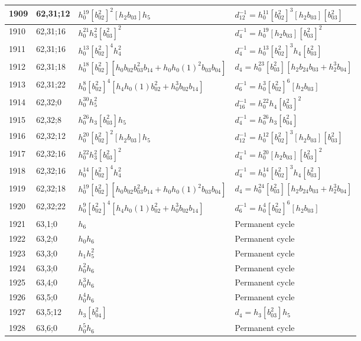\documentclass{article}
\begin{document}
\begin{longtable}{|l|l|>{\raggedright\arraybackslash}p{6cm}|>{\raggedright\arraybackslash}p{6cm}|}
1909 & 62,31;12 & $h_0^{19}[b_{02}^2]^2[h_2b_{03}]h_5$ & $d_{12}^{-1}=h_0^{11}[b_{02}^2]^3[h_2b_{03}][b_{03}^2]$\\
\hline
1910 & 62,31;16 & $h_0^{21}h_3^2[b_{03}^2]^2$ & $d_{4}^{-1}=h_0^{19}[h_2b_{03}][b_{03}^2]^2$\\
1911 & 62,31;16 & $h_0^{13}[b_{02}^2]^4h_4^2$ & $d_{4}^{-1}=h_0^{13}[b_{02}^2]^3h_4[b_{03}^2]$\\
\hline
1912 & 62,31;18 & $h_0^{18}[b_{02}^2][h_0b_{02}b_{03}^2b_{14} + h_0h_0(1)^2b_{03}b_{04}]$ &$d_{4}=h_0^{23}[b_{03}^2][h_2b_{24}b_{03} + h_2^3b_{04}]$\\
\hline
1913 & 62,31;22 & $h_0^8[b_{02}^2]^4[h_4h_0(1)b_{02}^2 + h_0^3b_{02}b_{14}]$ & $d_{6}^{-1}=h_0^3[b_{02}^2]^6[h_2b_{03}]$\\
\hline
1914 & 62,32;0 & $h_0^{30}h_5^2$ & $d_{16}^{-1}=h_0^{22}h_4[b_{03}^2]^2$\\
\hline
1915 & 62,32;8 & $h_0^{26}h_3[b_{03}^2]h_5$ & $d_{4}^{-1}=h_0^{26}h_3[b_{04}^2]$\\
\hline
1916 & 62,32;12 & $h_0^{20}[b_{02}^2]^2[h_2b_{03}]h_5$ & $d_{12}^{-1}=h_0^{12}[b_{02}^2]^3[h_2b_{03}][b_{03}^2]$\\
\hline
1917 & 62,32;16 & $h_0^{22}h_3^2[b_{03}^2]^2$ & $d_{4}^{-1}=h_0^{20}[h_2b_{03}][b_{03}^2]^2$\\
1918 & 62,32;16 & $h_0^{14}[b_{02}^2]^4h_4^2$ & $d_{4}^{-1}=h_0^{14}[b_{02}^2]^3h_4[b_{03}^2]$\\
\hline
1919 & 62,32;18 & $h_0^{19}[b_{02}^2][h_0b_{02}b_{03}^2b_{14} + h_0h_0(1)^2b_{03}b_{04}]$ &$d_{4}=h_0^{24}[b_{03}^2][h_2b_{24}b_{03} + h_2^3b_{04}]$\\
\hline
1920 & 62,32;22 & $h_0^9[b_{02}^2]^4[h_4h_0(1)b_{02}^2 + h_0^3b_{02}b_{14}]$ & $d_{6}^{-1}=h_0^4[b_{02}^2]^6[h_2b_{03}]$\\
\hline
1921 & 63,1;0 & $h_6$ & Permanent cycle\\
\hline
1922 & 63,2;0 & $h_0h_6$ & Permanent cycle\\
\hline
1923 & 63,3;0 & $h_1h_5^2$ & Permanent cycle\\
1924 & 63,3;0 & $h_0^2h_6$ & Permanent cycle\\
\hline
1925 & 63,4;0 & $h_0^3h_6$ & Permanent cycle\\
\hline
1926 & 63,5;0 & $h_0^4h_6$ & Permanent cycle\\
\hline
1927 & 63,5;12 & $h_3[b_{04}^2]$ &$d_{4}=h_3[b_{03}^2]h_5$\\
\hline
1928 & 63,6;0 & $h_0^5h_6$ & Permanent cycle\\

\end{longtable}
\end{document}
